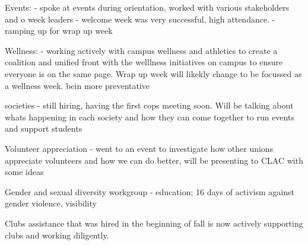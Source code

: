 
\begin{information}

    Events: 
    - spoke at events during orientation, worked with various stakeholders and
    o week leaders 
    - welcome week was very successful, high attendance. 
    - ramping up for wrap up week

    Wellness:
    - working actively with campus wellness and athletics to create a 
    coalition and unified front with the welllness initiatives on campus
    to ensure everyone is on the same page. Wrap up week will likekly change
    to be focussed as a wellness week. bein more preventative

    societies 
    - still hiring, having the first cops meeting soon. Will be talking about
    whats happening in each society and how they can come together to 
    run events and support students

    Volunteer appreciation
    - went to an event to investigate how other unions appreciate volunteers
    and how we can do better, will be presenting to CLAC with some ideas

    Gender and sexual diversity workgroup
    - education; 16 days of activism against gender violence, visibility 

    Clubs assistance that was hired in the beginning of fall is now actively
    supporting clubs and working diligently. 
    
\end{information}

